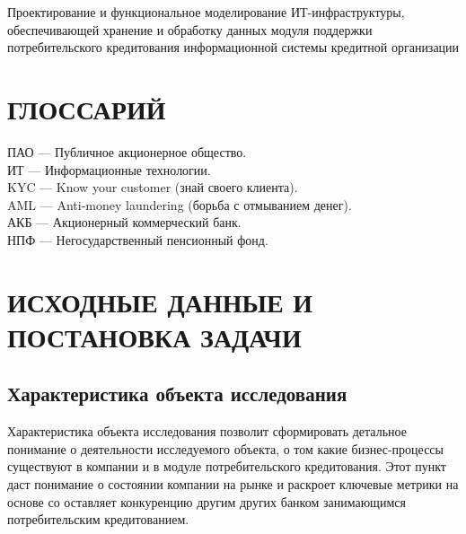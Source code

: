 \documentclass[14pt, a4paper]{extarticle}
\begin{document}
Проектирование и функциональное моделирование ИТ-инфраструктуры, обеспечивающей
хранение и обработку данных модуля поддержки потребительского кредитования
информационной системы кредитной организации

\section*{ГЛОССАРИЙ}
{}
\begin{raggedright}
	ПАО --- Публичное акционерное общество. \\ 
	ИТ --- Информационные технологии. \\ 
	KYC --- Know your customer (знай своего клиента). \\
	AML --- Anti-money laundering (борьба с отмыванием денег). \\
	АКБ --- Акционерный коммерческий банк. \\
	НПФ --- Негосударственный пенсионный фонд. \\
\end{raggedright}

\section{ИСХОДНЫЕ ДАННЫЕ И ПОСТАНОВКА ЗАДАЧИ}

\subsection{Характеристика объекта исследования}

Характеристика объекта исследования позволит сформировать детальное понимание о
деятельности исследуемого объекта, о том какие бизнес-процессы существуют в
компании и в модуле потребительского кредитования. Этот пункт даст понимание о
состоянии компании на рынке и раскроет ключевые метрики на основе со
оставляет конкуренцию другим других банком занимающимся потребительским
кредитованием.
\end{document}
